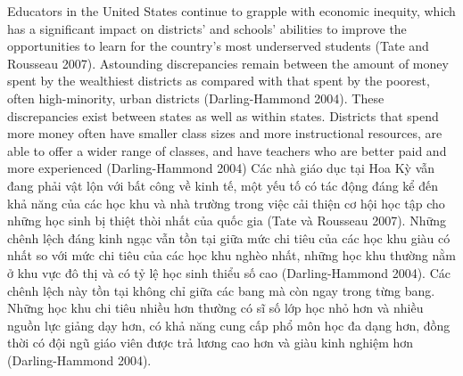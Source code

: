 \documentclass[
  10pt,
  a4paper,
  landscape,
  twoside,
  openany
]{scrbook}
\newcommand{\EN}[1]{#1}
\newcommand{\VI}[1]{#1}
\newcommand{\NOTE}[1]{#1}
\begin{document}
\TriPara
{
\EN{Educators in the United States continue to grapple with economic inequity, which has a significant impact on districts' and schools' abilities to improve the opportunities to learn for the country's most underserved students (Tate and Rousseau 2007). Astounding discrepancies remain between the amount of money spent by the wealthiest districts as compared with that spent by the poorest, often high-minority, urban districts (Darling-Hammond 2004). These discrepancies exist between states as well as within states. Districts that spend more money often have smaller class sizes and more instructional resources, are able to offer a wider range of classes, and have teachers who are better paid and more experienced (Darling-Hammond 2004)}
}
{
\VI{Các nhà giáo dục tại Hoa Kỳ vẫn đang phải vật lộn với bất công về kinh tế, một yếu tố có tác động đáng kể đến khả năng của các học khu và nhà trường trong việc cải thiện cơ hội học tập cho những học sinh bị thiệt thòi nhất của quốc gia (Tate và Rousseau 2007). Những chênh lệch đáng kinh ngạc vẫn tồn tại giữa mức chi tiêu của các học khu giàu có nhất so với mức chi tiêu của các học khu nghèo nhất, những học khu thường nằm ở khu vực đô thị và có tỷ lệ học sinh thiểu số cao (Darling-Hammond 2004). Các chênh lệch này tồn tại không chỉ giữa các bang mà còn ngay trong từng bang. Những học khu chi tiêu nhiều hơn thường có sĩ số lớp học nhỏ hơn và nhiều nguồn lực giảng dạy hơn, có khả năng cung cấp phổ môn học đa dạng hơn, đồng thời có đội ngũ giáo viên được trả lương cao hơn và giàu kinh nghiệm hơn (Darling-Hammond 2004).}
}
{
\NOTE{}
}
\end{document}
